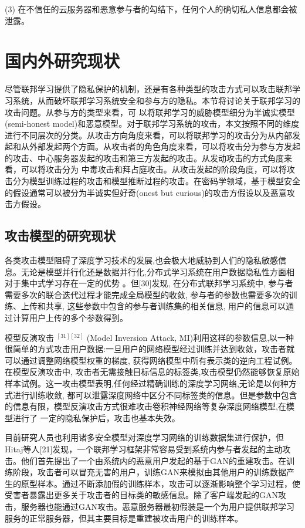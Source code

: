 (3) 在不信任的云服务器和恶意参与者的勾结下，任何个人的确切私人信息都会被泄露。

\section{国内外研究现状}
尽管联邦学习提供了隐私保护的机制，还是有各种类型的攻击方式可以攻击联邦学习系统，从而破坏联邦学习系统安全和参与方的隐私。本节将讨论关于联邦学习的攻击问题。从参与方的类型来看，可 以将联邦学习的威胁模型细分为半诚实模型 (semi-honest model)和恶意模型。对于联邦学习系统的攻击，本文按照不同的维度进行不同层次的分类。从攻击方向角度来看，可以将联邦学习的攻击分为从内部发起和从外部发起两个方面。从攻击者的角色角度来看，可以将攻击分为参与方发起的攻击、中心服务器发起的攻击和第三方发起的攻击。从发动攻击的方式角度来看，可以将攻击分为 中毒攻击和拜占庭攻击。从攻击发起的阶段角度，可以将攻击分为模型训练过程的攻击和模型推断过程的攻击。在密码学领域，基于模型安全的假设通常可以被分为半诚实但好奇(onest but curious)的攻击方假设以及恶意攻击方假设。

\subsection{攻击模型的研究现状}
各类攻击模型阻碍了深度学习技术的发展,也会极大地威胁到人们的隐私敏感信息。无论是模型并行化还是数据并行化,分布式学习系统在用户数据隐私性方面相对于集中式学习存在一定的优势 。但[30]发现, 在分布式联邦学习系统中, 参与者需要多次的联合迭代过程才能完成全局模型的收敛, 参与者的参数也需要多次的训练、上传和共享, 这些参数中包含的参与者训练集的相关信息, 用户的信息可以通过计算用户上传的多个参数得到。

模型反演攻击 $^{[31][32]}$ (Model Inversion Attack, MI)利用这样的参数信息,以一种很简单的方式攻击用户数据:一旦用户的网络模型经过训练并达到收敛，攻击者就可以通过调整网络模型权重的梯度, 获得网络模型中所有表示类的逆向工程试例。在模型反演攻击中, 攻击者无需接触目标信息的标签类,攻击模型仍然能够恢复原始样本试例。这一攻击模型表明,任何经过精确训练的深度学习网络,无论是以何种方式进行训练收敛, 都可以泄露深度网络中区分不同标签类的信息。但是参数中包含的信息有限，模型反演攻击方式很难攻击卷积神经网络等复杂深度网络模型,在模型进行了 一定的隐私保护后，攻击也基本失效。

目前研究人员也利用诸多安全模型对深度学习网络的训练数据集进行保护，但Hitaj等人[21]发现，一个联邦学习框架非常容易受到系统内参与者发起的主动攻击。他们首先提出了一个由系统内的恶意用户发起的基于GAN的重建攻击。在训练阶段，攻击者可以冒充无害的用户，训练GAN来模拟由其他用户的训练数据产生的原型样本。通过不断添加假的训练样本，攻击可以逐渐影响整个学习过程，使受害者暴露出更多关于攻击者的目标类的敏感信息。除了客户端发起的GAN攻击，服务器也能通过GAN攻击。恶意服务器最初假装是一个为用户提供联邦学习服务的正常服务器，但其主要目标是重建被攻击用户的训练样本。


